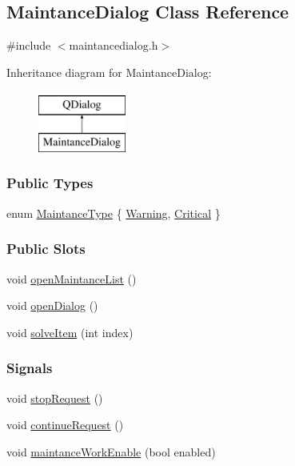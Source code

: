 \hypertarget{classMaintanceDialog}{}\subsection{Maintance\+Dialog Class Reference}
\label{classMaintanceDialog}


{\ttfamily \#include $<$maintancedialog.\+h$>$}

Inheritance diagram for Maintance\+Dialog\+:\begin{figure}[H]
\begin{center}
\leavevmode
\includegraphics[height=2.000000cm]{classMaintanceDialog}
\end{center}
\end{figure}
\subsubsection*{Public Types}
\begin{DoxyCompactItemize}
\item 
enum \mbox{\hyperlink{classMaintanceDialog_a0774fde5cbe916c333d8d1dd991a3b8f}{Maintance\+Type}} \{ \mbox{\hyperlink{classMaintanceDialog_a0774fde5cbe916c333d8d1dd991a3b8fa8fe148a4b5ff71d3568fd6aff35d027e}{Warning}}, 
\mbox{\hyperlink{classMaintanceDialog_a0774fde5cbe916c333d8d1dd991a3b8fa56052452a2261539060f7f5433d35d61}{Critical}}
 \}
\end{DoxyCompactItemize}
\subsubsection*{Public Slots}
\begin{DoxyCompactItemize}
\item 
void \mbox{\hyperlink{classMaintanceDialog_ab97eb55c76459c27bc3ccf5c6a515b1e}{open\+Maintance\+List}} ()
\item 
void \mbox{\hyperlink{classMaintanceDialog_a9abf5dd5b908282f9f81f266708dd456}{open\+Dialog}} ()
\item 
void \mbox{\hyperlink{classMaintanceDialog_a3958b309d854fcd5baf39fc166a6b5f6}{solve\+Item}} (int index)
\end{DoxyCompactItemize}
\subsubsection*{Signals}
\begin{DoxyCompactItemize}
\item 
void \mbox{\hyperlink{classMaintanceDialog_ae2420d128d65322e62fc88044b20f848}{stop\+Request}} ()
\item 
void \mbox{\hyperlink{classMaintanceDialog_aea9ae7ab9094dfb556fb9ec134b12609}{continue\+Request}} ()
\item 
void \mbox{\hyperlink{classMaintanceDialog_ada9e582be087bce2dd96a2629f2a417f}{maintance\+Work\+Enable}} (bool enabled)
\end{DoxyCompactItemize}
